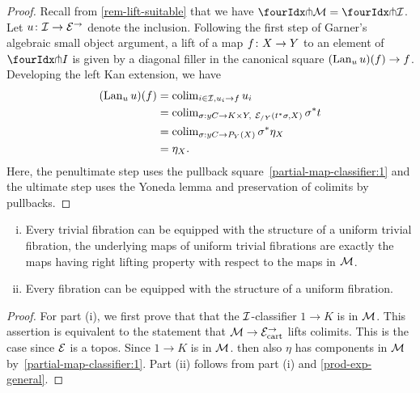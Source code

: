 \documentclass[reqno,10pt,a4paper,oneside,draft]{amsart}
\begin{document}
{{\begin{proof} 
Recall from \cref{rem-lift-suitable} that we have $\liftr{\cal{M}} = \liftr{\cal{I}}$.
Let $u \co \cal{I} \to \cal{E}^\to$ denote the inclusion.
Following the first step of Garner's algebraic small object argument, a lift of a map $f \co X \to Y$ to an element of $\liftr{I}$ is given by a diagonal filler in the canonical square $(\Lan_u u)(f) \to f$.
Developing the left Kan extension, we have
\begin{align*}
(\Lan_u u)(f)
&=
\colim_{i \in \cal{I}, u_i \to f} u_i
\\&=
\colim_{\sigma : y C \to K \times Y,\ \cal{E}_{/Y}(t^* \sigma, X)} \sigma^* t
\\&=
\colim_{\sigma : y C \to P_Y(X)} \sigma^* \eta_X
\\&=
\eta_X
.
\end{align*}
Here, the penultimate step uses the pullback square~\eqref{partial-map-classifier:1} and the ultimate step uses the Yoneda lemma and preservation of colimits by pullbacks.
\end{proof} 


\begin{corollary} \label{unif-vs-non-unif} \hfill 
\begin{enumerate}[(i)] 
\item  Every trivial fibration can be equipped with the structure of a uniform trivial fibration, \ie
the underlying maps of uniform trivial fibrations are exactly the maps having right lifting property with respect to 
the maps in $\cal{M}$.
\item Every fibration can be equipped with the structure of a uniform  fibration.
\end{enumerate}
\end{corollary} 

\begin{proof} For part (i), we first prove that that the $\cal{I}$-classifier $1 \to K$ is  in $\cal{M}$.
This assertion is equivalent to the statement that $\cal{M} \to \cal{E}^\to_{\cart}$ lifts colimits.
This is the case since $\cal{E}$ is a topos.
Since  $1 \to K$ is  in $\cal{M}$.  then also $\eta$ has components in $\cal{M}$ by~\eqref{partial-map-classifier:1}.
Part (ii) follows from part (i) and \cref{prod-exp-general}.
\end{proof} 


}}
\end{document}
